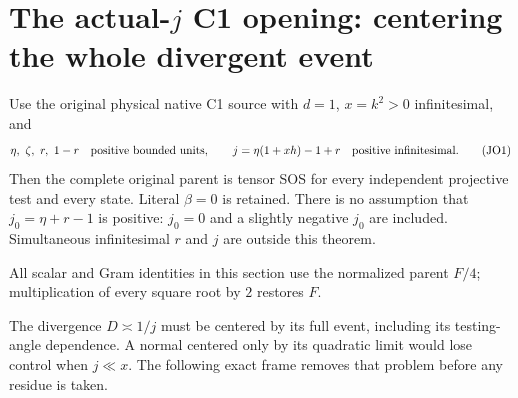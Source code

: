 \section{\texorpdfstring{The actual-$j$ C1 opening: centering the whole divergent event}{The actual-j C1 opening: centering the whole divergent event}}
\label{component:p48da253a150f}

\label{p48da253a150f:sec:r13-c1-j-opening}

\begin{theorem}
Use the original physical native C1 source with $d=1$, $x=k^2>0$
infinitesimal, and
\[
 \eta,\ \zeta,\ r,\ 1-r\quad\hbox{positive bounded units},\qquad
 j=\eta(1+xh)-1+r\quad\hbox{positive infinitesimal}.       \tag{JO1}
\]
Then the complete original parent is tensor SOS for every independent
projective test and every state. Literal $\beta=0$ is retained.
There is no assumption that $j_0=\eta+r-1$ is positive: $j_0=0$
and a slightly negative $j_0$ are included. Simultaneous infinitesimal
$r$ and $j$ are outside this theorem.
\end{theorem}

All scalar and Gram identities in this section use the normalized
parent $F/4$; multiplication of every square root by $2$ restores $F$.

The divergence $D\asymp1/j$ must be centered by its full event,
including its testing-angle dependence. A normal centered only by its
quadratic limit would lose control when $j\ll x$. The following exact
frame removes that problem before any residue is taken.

